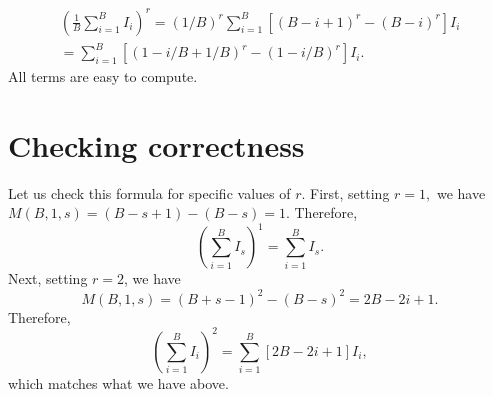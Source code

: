 \documentclass[12pt]{article}
\begin{document}
\begin{multline*}
\left(\frac{1}{B} \sum_{i=1}^B I_i\right)^r = (1/B)^r \sum_{i=1}^B \left[ (B-i+1)^r - (B-i)^r \right]I_i \\ = \sum_{i=1}^B \left[ (1 - i/B + 1/B)^r - (1 - i/B)^r \right] I_i.
\end{multline*}
All terms are easy to compute.

\section{Checking correctness}

Let us check this formula for specific values of $r$. First, setting $r = 1,$ we have $M(B,1,s) = (B - s + 1) - (B - s) = 1$. Therefore, $$\left(\sum_{i=1}^B I_s \right)^1 = \sum_{i=1}^B I_s.$$ Next, setting $r=2$, we have
$$M(B,1,s) = (B+s-1)^2 - (B-s)^2  = 2B - 2i + 1.$$ Therefore,
$$\left( \sum_{i=1}^B I_i \right)^2 = \sum_{i=1}^B [2B - 2i + 1]I_i,$$ which matches what we have above.
\end{document}
